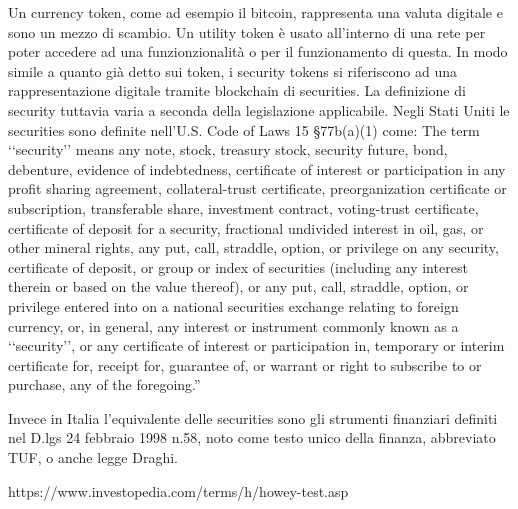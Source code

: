 Un currency token, come ad esempio il bitcoin, rappresenta una valuta digitale e sono un mezzo di scambio.
Un utility token è usato all'interno di una rete per poter accedere ad una funzionzionalità o per il funzionamento di questa. 
In modo simile a quanto già detto sui token, i security tokens si riferiscono ad una rappresentazione digitale tramite blockchain di securities. La definizione di security tuttavia varia a seconda della legislazione applicabile. Negli Stati Uniti le securities sono definite nell'U.S. Code of Laws 15 §77b(a)(1) come:
The term ‘‘security’’ means any note, stock, treasury stock, security future, bond, debenture, evidence of indebtedness, certificate of interest or participation in any profit sharing agreement, collateral-trust certificate, preorganization certificate or subscription, transferable share, investment
contract, voting-trust certificate, certificate of deposit for a security, fractional undivided interest in oil, gas, or other mineral rights, any put, call, straddle, option, or privilege on any security, certificate of deposit, or group or index of securities (including any interest therein or based on the value thereof), or
any put, call, straddle, option, or privilege entered into on a national securities exchange relating to foreign currency, or, in general, any interest or instrument commonly known as a ‘‘security’’, or any certificate of interest or participation in, temporary or interim certificate for, receipt for, guarantee of,
or warrant or right to subscribe to or purchase, any of the foregoing.”

Invece in Italia l'equivalente delle securities sono gli strumenti finanziari definiti nel D.lgs 24 febbraio 1998 n.58, noto come testo unico della finanza, abbreviato TUF, o anche legge Draghi. 


https://www.investopedia.com/terms/h/howey-test.asp



